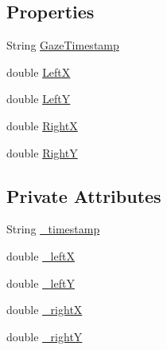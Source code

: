 \subsection*{Properties}
\begin{DoxyCompactItemize}
\item 
String \hyperlink{class_web_analyzer_1_1_events_1_1_prepare_gaze_data_event_ace28cb2b0e169c973f7c6ffef8aa2901}{Gaze\+Timestamp}
\item 
double \hyperlink{class_web_analyzer_1_1_events_1_1_prepare_gaze_data_event_a9e790efc1d1cd1dccf130c138e8700c4}{Left\+X}
\item 
double \hyperlink{class_web_analyzer_1_1_events_1_1_prepare_gaze_data_event_a60ae4df2f77ec34f2f4b7ae2241e8791}{Left\+Y}
\item 
double \hyperlink{class_web_analyzer_1_1_events_1_1_prepare_gaze_data_event_a680a99afeb211df3bbeb59ba505478c1}{Right\+X}
\item 
double \hyperlink{class_web_analyzer_1_1_events_1_1_prepare_gaze_data_event_a6e215a1ac2257a554a0af8c4adb11096}{Right\+Y}
\end{DoxyCompactItemize}
\subsection*{Private Attributes}
\begin{DoxyCompactItemize}
\item 
String \hyperlink{class_web_analyzer_1_1_events_1_1_prepare_gaze_data_event_ae044ce4acf002ba1481881cd1d2e6add}{\+\_\+timestamp}
\item 
double \hyperlink{class_web_analyzer_1_1_events_1_1_prepare_gaze_data_event_a590d9b88e061f7627f6aaf77a125ac3d}{\+\_\+left\+X}
\item 
double \hyperlink{class_web_analyzer_1_1_events_1_1_prepare_gaze_data_event_aad152c324dfcd09a233d7feff08ed406}{\+\_\+left\+Y}
\item 
double \hyperlink{class_web_analyzer_1_1_events_1_1_prepare_gaze_data_event_ab9ffdfd6d3d382b410df14447bb3a55c}{\+\_\+right\+X}
\item 
double \hyperlink{class_web_analyzer_1_1_events_1_1_prepare_gaze_data_event_a7e38aed1e4c3087bd7f43affe399c6f1}{\+\_\+right\+Y}
\end{DoxyCompactItemize}


